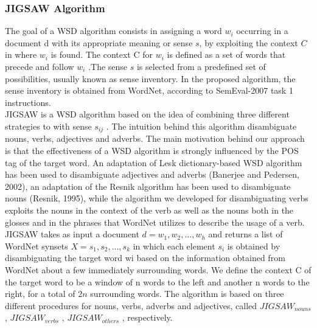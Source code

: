 \subsubsection{JIGSAW Algorithm\citep{disambiguation}}
\label{jigsawSec}
The goal of a WSD algorithm consists in assigning a word $w_i$ occurring in a document d with its appropriate meaning or sense $s$, by exploiting the context $C$ in where $w_i$ is found. The context C for $w_i$ is defined as a set of words that precede and follow $w_i$ .The sense $s$ is selected from a predefined set of possibilities, usually known as sense inventory. In the proposed algorithm, the sense inventory is obtained from WordNet, according to SemEval-2007 task 1 instructions. \\
JIGSAW is a WSD algorithm based on the idea of combining three different strategies to with sense $s_{ij}$ . The intuition behind this algorithm disambiguate nouns, verbs, adjectives and adverbs. The main motivation behind our approach is that the effectiveness of a WSD algorithm is strongly influenced by the POS tag of the target word. An adaptation of Lesk dictionary-based WSD algorithm has been used to disambiguate adjectives and adverbs (Banerjee and Pedersen, 2002), an adaptation of the Resnik algorithm has been used to disambiguate nouns (Resnik, 1995), while the algorithm we developed for disambiguating verbs exploits the nouns in the context of the verb as well as the nouns both in the glosses and in the phrases that WordNet utilizes to describe the usage of a verb. \\
JIGSAW takes as input a document $d = {w_1 , w_2 , . . . , w_h }$ and returns a list of WordNet synsets $X = {s_1 , s_2 , . . . ,s_k }$ in which each element $s_i$ is obtained by disambiguating the target word wi based on the information obtained from WordNet about a few immediately surrounding words. We define the context C of the target word to be a window of n words to the left and another n words to the right, for a total of $2n$ surrounding words. The algorithm is based on three different procedures for nouns, verbs, adverbs and adjectives, called $JIGSAW_{nouns}$ , $JIGSAW_{verbs}$ , $JIGSAW_{others}$ , respectively.


